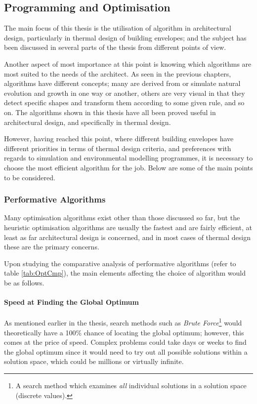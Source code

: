 \clearpage
\subsection{Programming and Optimisation}

The main focus of this thesis is the utilisation of algorithm in architectural design, particularly in thermal design of building envelopes; and the subject has been discussed in several parts of the thesis from different points of view.

Another aspect of most importance at this point is knowing which algorithms are most suited to the needs of the architect. As seen in the previous chapters, algorithms have different concepts; many are derived from or simulate natural evolution and growth in one way or another, others are very visual in that they detect specific shapes and transform them according to some given rule, and so on. The algorithms shown in this thesis have all been proved useful in architectural design, and specifically in thermal design.

However, having reached this point, where different building envelopes have different priorities in terms of thermal design criteria, and preferences with regards to simulation and environmental modelling programmes, it is necessary to choose the most efficient algorithm for the job. Below are some of the main points to be considered.

\subsubsection{Performative Algorithms}

Many optimisation algorithms exist other than those discussed so far, but the heuristic optimisation algorithms are usually the fastest and are fairly efficient, at least as far architectural design is concerned, and in most cases of thermal design these are the primary concerns.

Upon studying the comparative analysis of performative algorithms (refer to table \ref{tab:OptCmp}), the main elements affecting the choice of algorithm would be as follows.

\paragraph{Speed at Finding the Global Optimum}\mbox{}\vspace{-0.4cm}

As mentioned earlier in the thesis, search methods such as \emph{Brute Force}\footnote{A search method which examines \emph{all} individual solutions in a solution space (discrete values).} would theoretically have a 100\% chance of locating the global optimum; however, this comes at the price of speed. Complex problems could take days or weeks to find the global optimum since it would need to try out all possible solutions within a solution space, which could be millions or virtually infinite.

